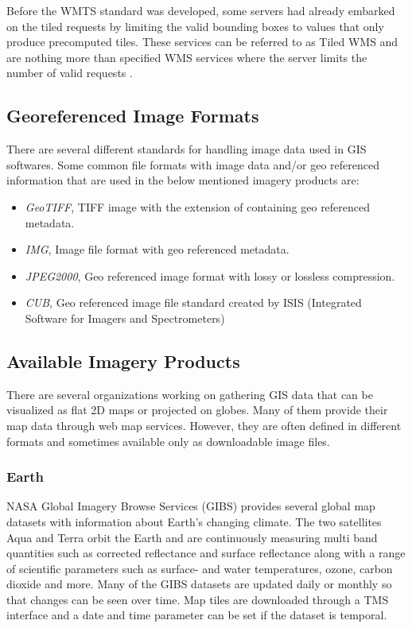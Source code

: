 Before the WMTS standard was developed, some servers had already embarked on the tiled requests by limiting the valid bounding boxes to values that only produce precomputed tiles. These services can be referred to as Tiled WMS and are nothing more than specified WMS services where the server limits the number of valid requests \cite{wmts10}.

\subsection{Georeferenced Image Formats}

There are several different standards for handling image data used in GIS softwares. Some common file formats with image data and/or geo referenced information that are used in the below mentioned imagery products are:

\begin{itemize}  
\item \emph{GeoTIFF}, TIFF image with the extension of containing geo referenced metadata. 
\item \emph{IMG}, Image file format with geo referenced metadata. 
\item \emph{JPEG2000}, Geo referenced image format with lossy or lossless compression.
\item \emph{CUB}, Geo referenced image file standard created by ISIS (Integrated Software for Imagers and Spectrometers)
\end{itemize}

\subsection{Available Imagery Products}

There are several organizations working on gathering GIS data that can be visualized as flat 2D maps or projected on globes. Many of them provide their map data through web map services. However, they are often defined in different formats and sometimes available only as downloadable image files.

\subsubsection{Earth}

NASA Global Imagery Browse Services (GIBS) provides several global map datasets with information about Earth's changing climate. The two satellites Aqua and Terra orbit the Earth and are continuously measuring multi band quantities such as corrected reflectance and surface reflectance along with a range of scientific parameters such as surface- and water temperatures, ozone, carbon dioxide and more. Many of the GIBS datasets are updated daily or monthly so that changes can be seen over time. Map tiles are downloaded through a TMS interface and a date and time parameter can be set if the dataset is temporal.

